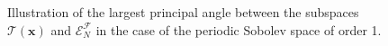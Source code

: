 \documentclass[twoside,11pt]{book}
\numberwithin{theorem}{chapter}
\numberwithin{definition}{chapter}
\numberwithin{proposition}{chapter}
\numberwithin{corollary}{chapter}
\numberwithin{example}{chapter}
\numberwithin{lemma}{chapter}
\numberwithin{assumption}{chapter}
\numberwithin{equation}{chapter}
\numberwithin{figure}{chapter}
\DeclareMathOperator{\Span}{\mathrm{Span}}
\DeclareMathOperator{\F}{\mathcal{F}}
\newcommand{\rb}[1]{\textcolor{magenta}{#1}}
\begin{document}

\begin{figure}[]
\centering

 \caption{Illustration of the largest principal angle between the subspaces $\mathcal{T}(\bm{x})$ and $\mathcal{E}_{N}^{\mathcal{F}}$ in the case of the periodic Sobolev space of order 1.  \label{fig:func_principal_angles}}
\end{figure}
\end{document}
